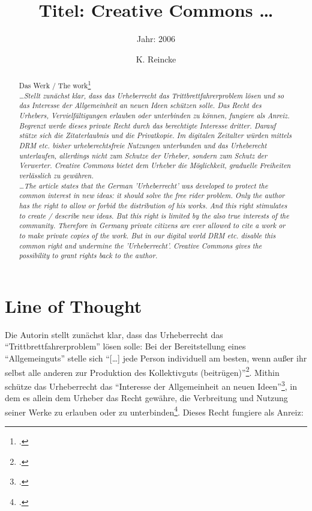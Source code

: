 \documentclass[DIV=calc,BCOR=5mm,11pt,headings=small,oneside,abstract=true, toc=bib]{scrartcl}
\begin{document}

\titlehead{Literaturexzerpt}
\subject{Autor(en): Euler}
\title{Titel: Creative Commons \ldots}
\subtitle{Jahr: 2006 }
\author{K. Reincke}

\maketitle

\begin{abstract}
\noindent

Das Werk / The work\footcite[][]{Euler2006a} \\
\noindent \itshape
\ldots Stellt zunächst klar, dass das Urheberrecht das Trittbrettfahrerproblem
lösen und so das Interesse der Allgemeinheit an neuen Ideen schützen solle. Das
Recht des Urhebers, Vervielfältigungen erlauben oder unterbinden zu können,
fungiere als Anreiz. Begrenzt werde dieses private Recht durch das berechtigte
Interesse dritter. Darauf stütze sich die Zitaterlaubnis und die Privatkopie. Im
digitalen Zeitalter würden mittels DRM etc. bisher urheberechtsfreie Nutzungen
unterbunden und das Urheberecht unterlaufen, allerdings nicht zum Schutze der
Urheber, sondern zum Schutz der Verwerter. Creative Commons bietet dem Urheber
die Möglichkeit, graduelle Freiheiten verlässlich zu gewähren.\\
\noindent
\ldots The article states that the German 'Urheberrecht' was developed to
protect the common interest in new ideas: it should solve the free rider
problem. Only the author has the right to allow or forbid the distribution of
his works. And this right stimulates to create / describe new ideas. But this
right is limited by the also true interests of the community. Therefore in
Germany private citizens are ever allowed to cite a work or to make private
copies of the work. But in our digital world DRM etc. disable this common right
and undermine the 'Urheberrecht'. Creative Commons gives the possibility to
grant rights back to the author.
\end{abstract}
\footnotesize
\normalsize

\section{Line of Thought}

Die Autorin stellt zunächst klar, dass das Urheberrecht das
\enquote{Trittbrettfahrerproblem} lösen solle: Bei der Bereitstellung eines
\enquote{Allgemeinguts} stelle sich \enquote{[\ldots] jede Person
individuell am besten, wenn außer ihr selbst alle anderen zur
Produktion des Kollektivguts (beitrügen)}\footcite[vgl.][149]{Euler2006a}.
Mithin schütze das Urheberrecht das \enquote{Interesse der Allgemeinheit an
neuen Ideen}\footcite[vgl.][149]{Euler2006a}, in dem es allein
dem Urheber das Recht gewähre, die Verbreitung und Nutzung seiner Werke zu
erlauben oder zu unterbinden\footcite[vgl.][148]{Euler2006a}. Dieses Recht
fungiere als Anreiz:
\end{document}

